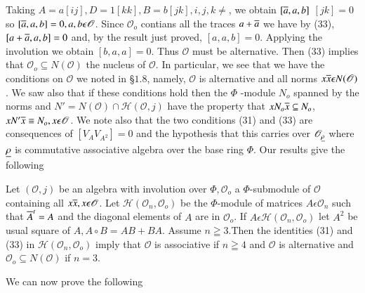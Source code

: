 Taking $A=a[ij], D=1[kk], B=b[jk], i,j, k\neq$, we obtain $[\overline{a},
  a,b]$ $[jk]=0$ so $[\overline{a},a,b]=0 ,a,b\epsilon \mathscr{O}$. Since
$\mathscr{O}_o$ contians all the traces $a+\overline{a}$ we have by (33),
$[a+\overline{a},a,b]=0$ and, by the result just proved,
$[a,a,b]=0$. Applying the involution we obtain $[b,a,a]=0$. Thus
$\mathscr{O}$ must be alternative. Then (33) implies that
$\mathscr{O}_o\subseteq N(\mathscr{O})$ the nucleus of
$\mathscr{O}$. In particular, we see that we have the\pageoriginale
conditions on $\mathscr{O}$ we noted in \S $1.8$, namely,
$\mathscr{O}$ is alternative and all norms $x\overline{x}\epsilon
N(\mathscr{O})$. We saw also that if these conditions hold then the
$\Phi$ -module $N_o$ spanned by the norms and
$N'=N(\mathscr{O})\cap\mathscr{H}(\mathscr{O},j)$ have the property
that $xN_o\overline{x}\subseteq N_o$, $xN'\overline{x}\equiv N_o,x\epsilon
\mathscr{O}$. We note also that the two conditions (31) and (33) are
consequences of $[V_AV_{A^{2}}]=0$ and the hypothesis that this
carries over $\mathscr{O}_{\underline{\rho}}$ where $\underline{\rho}$ is
commutative associative algebra over the base ring $\Phi$. Our results
give the following
\begin{lemma*}
Let $(\mathscr{O},j)$ be an algebra with involution over $\Phi,
\mathscr{O}_o$ a $\Phi$-submodule of $\mathscr{O}$ containing all
$x\overline{x},x\epsilon \mathscr{O}$. Let
$\mathscr{H}(\mathscr{O}_n,\mathscr{O}_o)$ be the $\Phi$-module of
matrices $A\epsilon \mathscr{O}_n$ such that $\overline{A}^{t}=A$ and the
diagonal elements of $A$ are in $\mathscr{O}_o$. If $A\epsilon
\mathscr{H}(\mathscr{O}_n,\mathscr{O}_o)$ let $A^{2}$ be usual square
of $A, A\circ B=AB+BA$. Assume $n\geqq 3$.Then the identities (31) and
(33) in $\mathscr{H}(\mathscr{O}_n,\mathscr{O}_o)$ imply that
$\mathscr{O}$ is associative if $n\geqq 4$ and $\mathscr{O}$ is
alternative and $\mathscr{O}_o\subseteq N(\mathscr{O})$ if $n=3$.

We can now prove the following
\end{lemma*}

